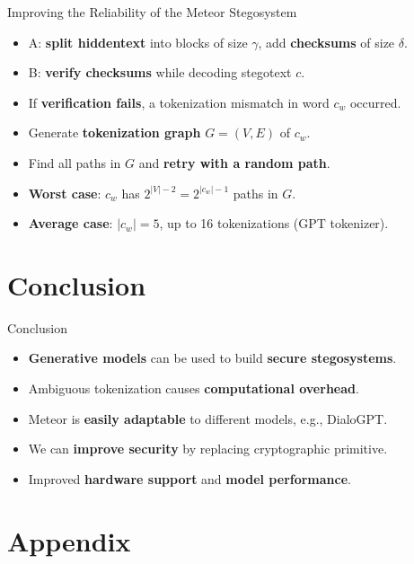 \documentclass[10pt]{beamer}
\begin{document}
\begin{frame}{Improving the Reliability of the Meteor Stegosystem}
	\begin{itemize}[<+->]
		\item A: \textbf{split hiddentext} into blocks of size $\gamma$, add \textbf{checksums} of size $\delta$.
		\item B: \textbf{verify checksums} while decoding stegotext $c$.
		\item If \textbf{verification fails}, a tokenization mismatch in word $c_w$ occurred.
		\item Generate \textbf{tokenization graph} $G=(V,E)$ of $c_w$.
		\item Find all paths in $G$ and \textbf{retry with a random path}.
		\item \textbf{Worst case}: $c_w$ has $2^{\left|V\right|-2} = 2^{|c_w|-1}$ paths in $G$.
		\item \textbf{Average case}: $|c_w| = 5$, up to 16 tokenizations (GPT tokenizer).
	\end{itemize}
\end{frame}

\section{Conclusion}

\begin{frame}{Conclusion}
    \begin{itemize}[<+->]
        \item \textbf{Generative models} can be used to build \textbf{secure stegosystems}.
        \item Ambiguous tokenization causes \textbf{computational overhead}.
        \item Meteor is \textbf{easily adaptable} to different models, e.g., DialoGPT.
        \item We can \textbf{improve security} by replacing cryptographic primitive.
        \item Improved \textbf{hardware support} and \textbf{model performance}.
    \end{itemize}
\end{frame}
	


\section*{Appendix}
\end{document}
